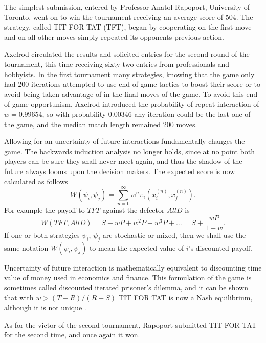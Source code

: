 The simplest submission, entered by Professor Anatol Rapoport, University of Toronto, went on to win the tournament receiving an average score of 504. The strategy, called TIT FOR TAT (TFT), began by cooperating on the first move and on all other moves simply repeated its opponents previous action.

Axelrod circulated the results and solicited entries for the second round of the tournament, this time receiving sixty two entries from professionals and hobbyists. In the first tournament many strategies, knowing that the game only had 200 iterations attempted to use end-of-game tactics to boost their score or to avoid being taken advantage of in the final moves of the game. To avoid this end-of-game opportunism, Axelrod introduced the probability of repeat interaction of $w = 0.99654$, so with probability $0.00346$ any iteration could be the last one of the game, and the median match length remained 200 moves.

Allowing for an uncertainty of future interactions fundamentally changes the game. The backwards induction analysis no longer holds, since at no point both players can be sure they shall never meet again, and thus the shadow of the future always looms upon the decision makers. The expected score is now calculated as follows
\[
W(\psi_i, \psi_j) = \sum_{n=0}^\infty w^n \pi_i(x_i^{(n)}, x_j^{(n)})
.\]
For example the payoff to $TFT$ against the defector $AllD$ is
\[
W(TFT, AllD) = S + wP + w^2P + w^3P + \dots = S + \frac{wP}{1-w}
.\]
If one or both strategies $\psi_i$, $\psi_j$ are stochastic or mixed, then we shall use the same notation $W(\psi_i, \psi_j)$ to mean the expected value of $i$'s discounted payoff.

Uncertainty of future interaction is mathematically equivalent to discounting time value of money used in economics and finance. This formulation of the game is sometimes called discounted iterated prisoner's dilemma, and it can be shown that with $w > (T-R)/(R-S)$ TIT FOR TAT is now a Nash equilibrium, although it is not unique \cite[p.207]{axelrod1984evolution}.

As for the victor of the second tournament, Rapoport submitted TIT FOR TAT for the second time, and once again it won.
\\
\\

